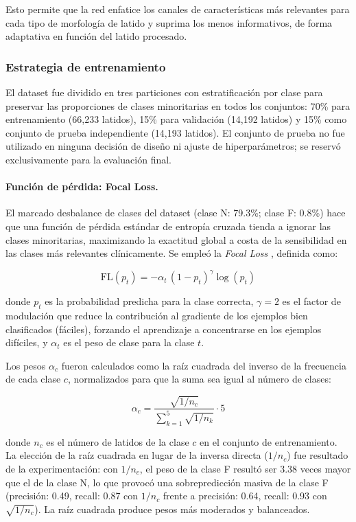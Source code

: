 Esto permite que la red enfatice los canales de características más relevantes para cada tipo de morfología de latido y suprima los menos informativos, de forma adaptativa en función del latido procesado.

\subsubsection{Estrategia de entrenamiento}

El dataset fue dividido en tres particiones con estratificación por clase para preservar las proporciones de clases minoritarias en todos los conjuntos: 70\% para entrenamiento (66,233 latidos), 15\% para validación (14,192 latidos) y 15\% como conjunto de prueba independiente (14,193 latidos). El conjunto de prueba no fue utilizado en ninguna decisión de diseño ni ajuste de hiperparámetros; se reservó exclusivamente para la evaluación final.

\paragraph{Función de pérdida: Focal Loss.}
El marcado desbalance de clases del dataset (clase N: 79.3\%; clase F: 0.8\%) hace que una función de pérdida estándar de entropía cruzada tienda a ignorar las clases minoritarias, maximizando la exactitud global a costa de la sensibilidad en las clases más relevantes clínicamente. Se empleó la \textit{Focal Loss} \cite{Lin2017}, definida como:

\begin{equation}
\text{FL}(p_t) = -\alpha_t\,(1 - p_t)^\gamma \log(p_t)
\label{eq:focal}
\end{equation}

donde $p_t$ es la probabilidad predicha para la clase correcta, $\gamma = 2$ es el factor de modulación que reduce la contribución al gradiente de los ejemplos bien clasificados (fáciles), forzando el aprendizaje a concentrarse en los ejemplos difíciles, y $\alpha_t$ es el peso de clase para la clase $t$.

Los pesos $\alpha_c$ fueron calculados como la raíz cuadrada del inverso de la frecuencia de cada clase $c$, normalizados para que la suma sea igual al número de clases:

\begin{equation}
\alpha_c = \frac{\sqrt{1/n_c}}{\sum_{k=1}^{5} \sqrt{1/n_k}} \cdot 5
\label{eq:alpha}
\end{equation}

donde $n_c$ es el número de latidos de la clase $c$ en el conjunto de entrenamiento. La elección de la raíz cuadrada en lugar de la inversa directa ($1/n_c$) fue resultado de la experimentación: con $1/n_c$, el peso de la clase F resultó ser 3.38 veces mayor que el de la clase N, lo que provocó una sobrepredicción masiva de la clase F (precisión: 0.49, recall: 0.87 con $1/n_c$ frente a precisión: 0.64, recall: 0.93 con $\sqrt{1/n_c}$). La raíz cuadrada produce pesos más moderados y balanceados.

